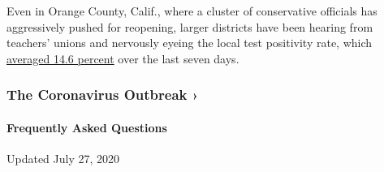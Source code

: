 Even in Orange County, Calif., where a cluster of conservative officials
has aggressively pushed for reopening, larger districts have been
hearing from teachers' unions and nervously eyeing the local test
positivity rate, which
\href{https://ochca.maps.arcgis.com/apps/opsdashboard/index.html\#/cc4859c8c522496b9f21c451de2fedae}{averaged
14.6 percent} over the last seven days.

\href{https://www.nytimes.com/news-event/coronavirus?action=click\&pgtype=Article\&state=default\&region=MAIN_CONTENT_3\&context=storylines_faq}{}

\hypertarget{the-coronavirus-outbreak-}{%
\subsubsection{The Coronavirus Outbreak
›}\label{the-coronavirus-outbreak-}}

\hypertarget{frequently-asked-questions}{%
\paragraph{Frequently Asked
Questions}\label{frequently-asked-questions}}

Updated July 27, 2020

